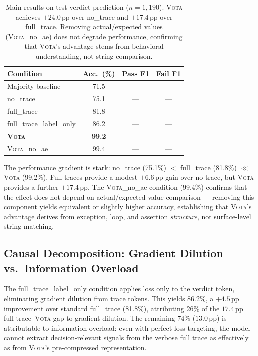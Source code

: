 \documentclass[11pt,a4paper]{article}
\newcommand{\vota}{\textsc{Vota}}
\newcommand{\pp}{\,\text{pp}}
\begin{document}
\begin{table}[t]
\centering
\small
\begin{tabular}{lccc}
\toprule
\textbf{Condition} & \textbf{Acc.\ (\%)} & \textbf{Pass F1} & \textbf{Fail F1} \\
\midrule
Majority baseline & 71.5 & --- & --- \\
no\_trace & 75.1 & --- & --- \\
full\_trace & 81.8 & --- & --- \\
full\_trace\_label\_only & 86.2 & --- & --- \\
\textbf{\vota{}} & \textbf{99.2} & --- & --- \\
\vota{}\_no\_ae & 99.4 & --- & --- \\
\bottomrule
\end{tabular}
\caption{Main results on test verdict prediction ($n=1{,}190$). \vota{} achieves $+24.0\pp$ over no\_trace and $+17.4\pp$ over full\_trace. Removing actual/expected values (\vota{}\_no\_ae) does not degrade performance, confirming that \vota{}'s advantage stems from behavioral understanding, not string comparison.}
\label{tab:main}
\end{table}

The performance gradient is stark: no\_trace (75.1\%) $<$ full\_trace (81.8\%) $\ll$ \vota{} (99.2\%).
Full traces provide a modest $+6.6\pp$ gain over no trace, but \vota{} provides a further $+17.4\pp$.
The \vota{}\_no\_ae condition (99.4\%) confirms that the effect does not depend on actual/expected value comparison --- removing this component yields equivalent or slightly higher accuracy, establishing that \vota{}'s advantage derives from exception, loop, and assertion \emph{structure}, not surface-level string matching.

\subsection{Causal Decomposition: Gradient Dilution vs.\ Information Overload}
\label{sec:causal}

The full\_trace\_label\_only condition applies loss only to the verdict token, eliminating gradient dilution from trace tokens.
This yields 86.2\%, a $+4.5\pp$ improvement over standard full\_trace (81.8\%), attributing 26\% of the $17.4\pp$ full-trace--\vota{} gap to gradient dilution.
The remaining 74\% ($13.0\pp$) is attributable to information overload: even with perfect loss targeting, the model cannot extract decision-relevant signals from the verbose full trace as effectively as from \vota{}'s pre-compressed representation.
\end{document}
